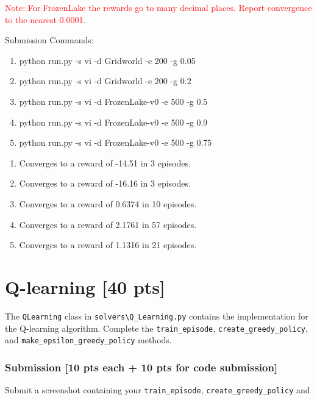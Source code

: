 \documentclass[a4paper]{article}
\theoremstyle{definition}
\newcommand{\red}[1]{\textcolor{red}{#1}}
\newenvironment{soln}{
    \leavevmode\color{blue}\ignorespaces
}{}
\begin{document}
\red{Note: For FrozenLake the rewards go to many decimal places. Report convergence to the nearest 0.0001.}

\vspace{8mm}

Submission Commands:
\begin{enumerate} 
    \item   python run.py -s vi -d Gridworld -e 200 -g 0.05
    \item   python run.py -s vi -d Gridworld -e 200 -g 0.2
    \item  python run.py -s vi -d FrozenLake-v0 -e 500 -g 0.5   
    \item  python run.py -s vi -d FrozenLake-v0 -e 500 -g 0.9  
    \item python run.py -s vi -d FrozenLake-v0 -e 500 -g 0.75 
\end{enumerate}

\begin{soln}
    \begin{enumerate}
        \item Converges to a reward of -14.51 in 3 episodes.
        \item Converges to a reward of -16.16 in 3 episodes.
        \item Converges to a reward of 0.6374 in 10 episodes.
        \item Converges to a reward of 2.1761 in 57 episodes.
        \item Converges to a reward of 1.1316 in 21 episodes.
    \end{enumerate}
\end{soln}



\section{Q-learning [40 pts]}

The \verb|QLearning| class in \verb|solvers\Q_Learning.py| contains the implementation for the Q-learning algorithm. Complete the \verb|train_episode|, \verb|create_greedy_policy|,  and \verb|make_epsilon_greedy_policy| methods.

\subsubsection*{Submission [10 pts each + 10 pts for code submission]}

Submit a screenshot containing your \verb|train_episode|, \verb|create_greedy_policy| and 
\end{document}
